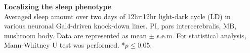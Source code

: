 \label{fig:S5}
\textbf{Localizing the sleep phenotype}
\\
Averaged sleep amount over two days of 12hr:12hr light-dark cycle (LD) in various neuronal Gal4-driven knock-down lines.
PI, pars intercerebralis, MB, mushroom body.
Data are represented as mean $\pm$ s.e.m.
For statistical analysis, Mann-Whitney U test was performed.
*$p\le$0.05.